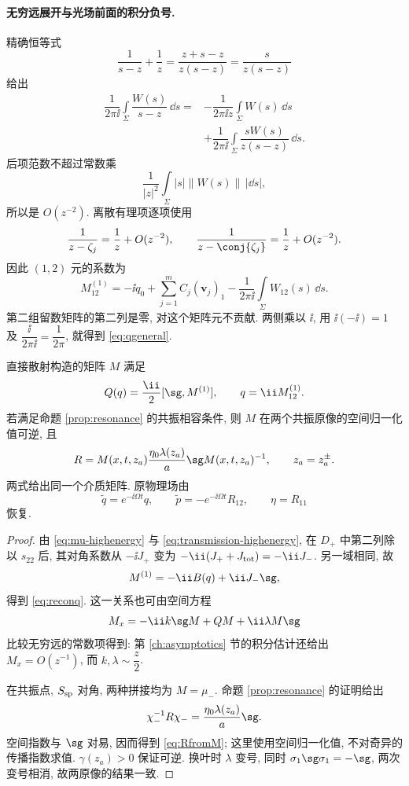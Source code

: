 \paragraph{无穷远展开与光场前面的积分负号.}
精确恒等式
\[
\dfrac{1}{s-z}+\dfrac{1}{z}
=\dfrac{z+s-z}{z(s-z)}
=\dfrac{s}{z(s-z)}
\]
给出
\[
\begin{aligned}
\dfrac{1}{2\pi\ii}\int\limits_\Sigma
\dfrac{W(s)}{s-z}\,\dd s
={}&-\dfrac{1}{2\pi\ii z}\int\limits_\Sigma W(s)\,\dd s\\
&+\dfrac{1}{2\pi\ii}\int\limits_\Sigma
\dfrac{sW(s)}{z(s-z)}\,\dd s.
\end{aligned}
\]
后项范数不超过常数乘
\[
\dfrac{1}{|z|^2}\int\limits_\Sigma |s|\|W(s)\|\,|\dd s|,
\]
所以是 $O(z^{-2})$.
离散有理项逐项使用
\[
\dfrac{1}{z-\zeta_j}=\dfrac{1}{z}+O(z^{-2}),\qquad
\dfrac{1}{z-\conj{\zeta_j}}=\dfrac{1}{z}+O(z^{-2}).
\]
因此 $(1,2)$ 元的系数为
\[
M^{(1)}_{12}
=-\ii q_0
+\sum\limits_{j=1}^{m}C_j(\mathbf v_j)_1
-\dfrac{1}{2\pi\ii}\int\limits_\Sigma W_{12}(s)\,\dd s.
\]
第二组留数矩阵的第二列是零, 对这个矩阵元不贡献.
两侧乘以 $\ii$, 用 $\ii(-\ii)=1$ 及
$\dfrac{\ii}{2\pi\ii}=\dfrac{1}{2\pi}$, 就得到 \eqref{eq:qgeneral}.
\begin{proposition}[光场与介质重构]\label{prop:reconstruction}
直接散射构造的矩阵 $M$ 满足
\begin{equation}\label{eq:reconq}
Q(q)=\dfrac{\ii}{2}[\sg,M^{(1)}],\qquad q=\ii M^{(1)}_{12}.
\end{equation}
若满足命题 \ref{prop:resonance} 的共振相容条件, 则 $M$ 在两个共振原像的空间归一化值可逆, 且
\begin{equation}\label{eq:RfromM}
R=M(x,t,z_a)\dfrac{\eta_0\lambda(z_a)}{a}\sg M(x,t,z_a)^{-1},
\qquad z_a=z_a^\pm.
\end{equation}
两式给出同一个介质矩阵. 原物理场由
\begin{equation}\label{eq:original-fields}
\widetilde q=e^{-\ii\Omega t}q,\qquad
\widetilde p=-e^{-\ii\Omega t}R_{12},\qquad \eta=R_{11}
\end{equation}
恢复.
\end{proposition}
\begin{proof}
由 \eqref{eq:mu-highenergy} 与 \eqref{eq:transmission-highenergy}, 在 $D_+$ 中第二列除以 $s_{22}$ 后, 其对角系数从 $-\ii J_+$ 变为 $-\ii(J_++J_{\rm tot})=-\ii J_-$. 另一域相同, 故
\[
M^{(1)}=-\ii B(q)+\ii J_-\sg,
\]
得到 \eqref{eq:reconq}. 这一关系也可由空间方程
\begin{equation}\label{eq:Mspace}
M_x=-\ii k\sg M+QM+\ii\lambda M\sg
\end{equation}
比较无穷远的常数项得到: 第 \ref{ch:asymptotics} 节的积分估计还给出 $M_x=O(z^{-1})$, 而 $k,\lambda\sim\dfrac{z}{2}$.

在共振点, $S_{\rm sp}$ 对角, 两种拼接均为 $M=\mu_-$. 命题 \ref{prop:resonance} 的证明给出
\[
\chi_-^{-1}R\chi_-=\dfrac{\eta_0\lambda(z_a)}{a}\sg.
\]
空间指数与 $\sg$ 对易, 因而得到 \eqref{eq:RfromM}; 这里使用空间归一化值, 不对奇异的传播指数求值. $\gamma(z_a)>0$ 保证可逆. 换叶时 $\lambda$ 变号, 同时 $\sigma_1\sg\sigma_1=-\sg$, 两次变号相消, 故两原像的结果一致.
\end{proof}

